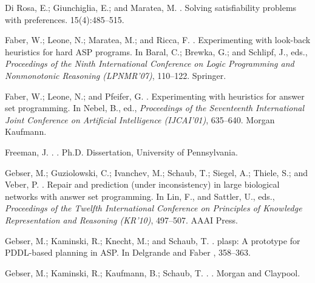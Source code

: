 \documentclass[letterpaper]{article}
\begin{document}
\begin{thebibliography}{}
{Di Rosa}, E.; Giunchiglia, E.; and Maratea, M.
.
\newblock Solving satisfiability problems with preferences.
 15(4):485--515.

Faber, W.; Leone, N.; Maratea, M.; and Ricca, F.
.
\newblock Experimenting with look-back heuristics for hard {ASP} programs.
\newblock In Baral, C.; Brewka, G.; and Schlipf, J., eds., {\em Proceedings of
  the Ninth International Conference on Logic Programming and Nonmonotonic
  Reasoning (LPNMR'07)},  110--122.
\newblock Springer.

Faber, W.; Leone, N.; and Pfeifer, G.
.
\newblock Experimenting with heuristics for answer set programming.
\newblock In Nebel, B., ed., {\em Proceedings of the Seventeenth International
  Joint Conference on Artificial Intelligence (IJCAI'01)},  635--640.
\newblock Morgan Kaufmann.

Freeman, J.
.
.
\newblock Ph.D. Dissertation, University of Pennsylvania.

Gebser, M.; Guziolowski, C.; Ivanchev, M.; Schaub, T.; Siegel, A.; Thiele, S.;
  and Veber, P.
.
\newblock Repair and prediction (under inconsistency) in large biological
  networks with answer set programming.
\newblock In Lin, F., and Sattler, U., eds., {\em Proceedings of the Twelfth
  International Conference on Principles of Knowledge Representation and
  Reasoning (KR'10)},  497--507.
\newblock AAAI Press.

Gebser, M.; Kaminski, R.; Knecht, M.; and Schaub, T.
.
\newblock plasp: A prototype for {PDDL}-based planning in {ASP}.
\newblock In Delgrande and Faber ,  358--363.

Gebser, M.; Kaminski, R.; Kaufmann, B.; Schaub, T.
.
.
\newblock  Morgan and Claypool.



\end{thebibliography}
\end{document}
